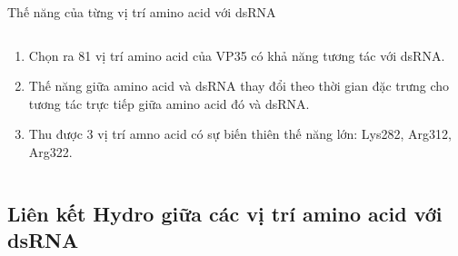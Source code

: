 \documentclass[10pt]{beamer}
\begin{document}
\begin{frame}{Thế năng của từng vị trí amino acid với dsRNA}
\begin{columns}
	\begin{column}{0.6\textwidth}
	\begin{enumerate}
		\item Chọn ra 81 vị trí amino acid của VP35 có khả năng tương tác với dsRNA.
		\item Thế năng giữa amino acid và dsRNA thay đổi theo thời gian đặc trưng cho tương tác trực tiếp giữa amino acid đó và dsRNA.
		\item Thu được 3 vị trí amno acid có sự biến thiên thế năng lớn: Lys282, Arg312, Arg322.
	\end{enumerate}
	\end{column}
	\end{columns}
	\end{frame}


\subsection{Liên kết Hydro giữa các vị trí amino acid với dsRNA}
\end{document}
